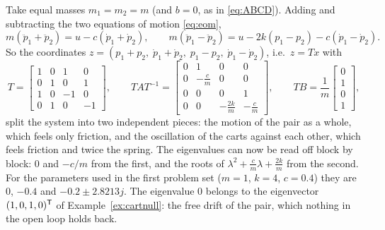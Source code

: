\documentclass[11pt]{article}
\begin{document}
\begin{example}\label{ex:cartdecouple}
Take equal masses $m_1=m_2=m$ (and $b=0$, as in \eqref{eq:ABCD}). Adding and
subtracting the two equations of motion \eqref{eq:eom},
\[
   m(\ddot p_1+\ddot p_2) = u - c(\dot p_1+\dot p_2),\qquad
   m(\ddot p_1-\ddot p_2) = u - 2k(p_1-p_2) - c(\dot p_1-\dot p_2).
\]
So the coordinates $z=(p_1+p_2,\;\dot p_1+\dot p_2,\;p_1-p_2,\;\dot p_1-\dot p_2)$,
i.e.\ $z=Tx$ with
\[
   T=\begin{bmatrix}1&0&1&0\\0&1&0&1\\1&0&-1&0\\0&1&0&-1\end{bmatrix},
   \qquad
   TAT^{-1}=\begin{bmatrix}0&1&0&0\\0&-\frac cm&0&0\\0&0&0&1\\0&0&-\frac{2k}m&-\frac cm\end{bmatrix},
   \qquad TB=\frac1m\begin{bmatrix}0\\1\\0\\1\end{bmatrix},
\]
split the system into two independent pieces: the motion of the pair as a whole,
which feels only friction, and the oscillation of the carts against each other,
which feels friction and twice the spring. The eigenvalues can now be read off
block by block: $0$ and $-c/m$ from the first, and the roots of
$\lambda^{2}+\frac cm\lambda+\frac{2k}{m}$ from the second. For the parameters used
in the first problem set ($m=1$, $k=4$, $c=0.4$) they are $0$, $-0.4$ and
$-0.2\pm2.8213j$. The eigenvalue $0$ belongs to the eigenvector $(1,0,1,0)^{\mathsf{T}}$ of
Example~\ref{ex:cartnull}: the free drift of the pair, which nothing in the
open loop holds back.
\end{example}
\end{document}
